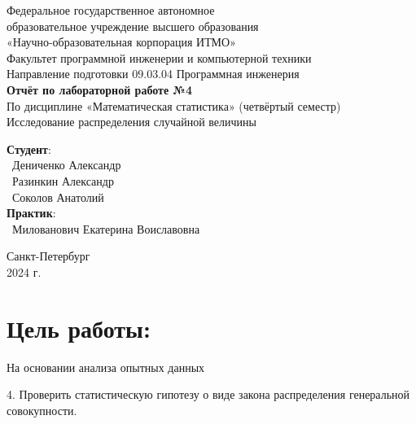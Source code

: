 \documentclass{article}
\begin{document}
\begin{center}
    \Large
    Федеральное государственное автономное \\
    образовательное учреждение высшего образования \\ 
    «Научно-образовательная корпорация ИТМО»\\
    \vspace{0.5cm}
    \large
    Факультет программной инженерии и компьютерной техники \\
    Направление подготовки 09.03.04 Программная инженерия \\
    \vspace{1cm}
    \Large
    \textbf{Отчёт по лабораторной работе №4} \\
    По дисциплине «Математическая статистика» (четвёртый семестр)\\
    Исследование распределения случайной величины\\
    \large
    \vspace{8cm}

    \begin{minipage}{.33\textwidth}
    \end{minipage}
    \hfill
    \begin{minipage}{.4\textwidth}
    
        \textbf{Студент}: \vspace{.1cm} \\
        \ Дениченко Александр\\
        \ Разинкин Александр\\
        \ Соколов Анатолий\\
        \textbf{Практик}:  \\
        \ Милованович Екатерина Воиславовна
    \end{minipage}
    \vfill
Санкт-Петербург\\ 2024 г.
\end{center}

\newpage
\section*{Цель работы:}
\large

На основании анализа опытных данных

4. Проверить статистическую гипотезу о виде закона распределения генеральной совокупности.
\end{document}
